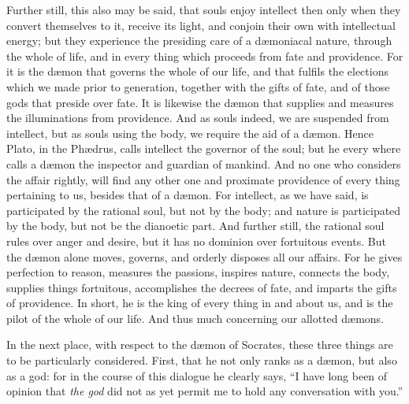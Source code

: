 \documentclass[12pt]{article}
\begin{document}
Further still, this also may be said, that souls enjoy intellect then only when
they convert themselves to it, receive its light, and conjoin their own with
intellectual energy; but they experience the presiding care of a d{\ae}moniacal
nature, through the whole of life, and in every thing which proceeds from fate
and providence. For it is the d{\ae}mon that governs the whole of our life, and
that fulfils the elections which we made prior to generation, together with the
gifts of fate, and of those gods that preside over fate. It is likewise the
d{\ae}mon that supplies and measures the illuminations from providence. And as
souls indeed, we are suspended from intellect, but as souls using the body, we
require the aid of a d{\ae}mon. Hence Plato, in the Ph{\ae}drus, calls
intellect the governor of the soul; but he every where calls a d{\ae}mon the
inspector and guardian of mankind. And no one who considers the affair rightly,
will find any other one and proximate providence of every thing pertaining to
us, besides that of a d{\ae}mon. For intellect, as we have said, is
participated by the rational soul, but not by the body; and nature is
participated by the body, but not be the dianoetic part. And further still, the
rational soul rules over anger and desire, but it has no dominion over
fortuitous events. But the d{\ae}mon alone moves, governs, and orderly disposes
all our affairs. For he gives perfection to reason, measures the passions,
inspires nature, connects the body, supplies things fortuitous, accomplishes
the decrees of fate, and imparts the gifts of providence. In short, he is the
king of every thing in and about us, and is the pilot of the whole of our
life. And thus much concerning our allotted d{\ae}mons.

In the next place, with respect to the d{\ae}mon of Socrates, these three
things are to be particularly considered. First, that he not only ranks as a
d{\ae}mon, but also as a god: for in the course of this dialogue he clearly
says, ``I have long been of opinion that \textit{the god} did not as yet permit
me to hold any conversation with you.''
\end{document}
